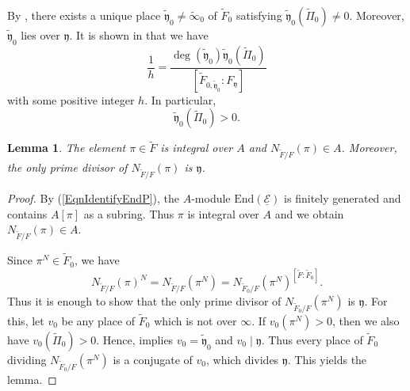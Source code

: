 \documentclass[10pt]{amsart}
\theoremstyle{plain}
\newtheorem{lem}[thm]{Lemma}
\theoremstyle{definition}
\newcommand{\End}{\mathrm{End}}
\newcommand{\ucE}{\underline{\mathcal{E}}}
\newcommand{\fry}{\mathfrak{y}}
\begin{document}
By \cite[Proposition 9.9 (iii)]{LRS}, 
there exists a unique place $\tilde{\fry}_0\neq \tilde{\infty}_0$ of $\tilde{F}_{0}$ satisfying $\tilde{\fry}_0(\tilde{\Pi}_0)\neq 0$.
Moreover, $\tilde{\fry}_0$ lies over $\fry$. It is shown in \cite[p.~265]{LRS} that we have
\[
\frac{1}{h}=\frac{\deg(\tilde{\fry}_0)\tilde{\fry}_0(\tilde{\Pi}_0)}{[\tilde{F}_{0,\tilde{\fry}_0}:F_\fry]}
\]
with some positive integer $h$. In particular, 
\begin{equation}\label{EqnYPiPositive}
	\tilde{\fry}_0(\tilde{\Pi}_0)>0.
\end{equation}

\begin{lem}\label{LemNormPi}
	The element $\pi\in \tilde{F}$ is integral over $A$ and $N_{\tilde{F}/F}(\pi)\in A$. 
	Moreover, the only prime divisor of $N_{\tilde{F}/F}(\pi)$ is $\fry$. 
\end{lem}
\begin{proof}
	By (\ref{EqnIdentifyEndP}), the $A$-module $\End(\ucE)$ is finitely generated and contains $A[\pi]$ as a subring.
	Thus $\pi$ is integral over $A$ and we obtain $N_{\tilde{F}/F}(\pi)\in A$.
	
	
	Since $\pi^N\in \tilde{F}_0$, we have
	\[
	N_{\tilde{F}/F}(\pi)^N=N_{\tilde{F}/F}(\pi^N)=N_{\tilde{F}_0/F}(\pi^N)^{[\tilde{F}:\tilde{F}_0]}.
	\]
	Thus it is enough to show that the only prime divisor of $N_{\tilde{F}_0/F}(\pi^N)$ is $\fry$. 
	For this, let $v_0$ be any place of $\tilde{F}_0$ which
	is not over $\infty$. If $v_0(\pi^N)>0$, then we also have $v_0(\tilde{\Pi}_0)>0$.
	Hence, \cite[Proposition 9.9 (iii)]{LRS} implies $v_0=\tilde{\fry}_0$ and $v_0\mid \fry$. 
	Thus every place of $\tilde{F}_0$ dividing $N_{\tilde{F}_0/F}(\pi^N)$ is a conjugate of $v_0$, which divides $\fry$.
	This yields the lemma.
\end{proof}
\end{document}
